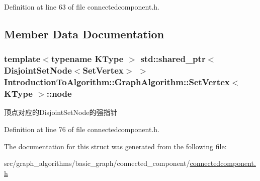 Definition at line 63 of file connectedcomponent.\+h.



\subsection{Member Data Documentation}
\hypertarget{struct_introduction_to_algorithm_1_1_graph_algorithm_1_1_set_vertex_aa01ac00440b97a31134559be597fe772}{}
\subsubsection[{node}]{\setlength{\rightskip}{0pt plus 5cm}template$<$typename K\+Type $>$ std\+::shared\+\_\+ptr$<${\bf Disjoint\+Set\+Node}$<${\bf Set\+Vertex}$>$ $>$ {\bf Introduction\+To\+Algorithm\+::\+Graph\+Algorithm\+::\+Set\+Vertex}$<$ K\+Type $>$\+::node}\label{struct_introduction_to_algorithm_1_1_graph_algorithm_1_1_set_vertex_aa01ac00440b97a31134559be597fe772}
顶点对应的\+Disjoint\+Set\+Node的强指针 

Definition at line 76 of file connectedcomponent.\+h.



The documentation for this struct was generated from the following file\+:\begin{DoxyCompactItemize}
\item 
src/graph\+\_\+algorithms/basic\+\_\+graph/connected\+\_\+component/\hyperlink{connectedcomponent_8h}{connectedcomponent.\+h}\end{DoxyCompactItemize}
